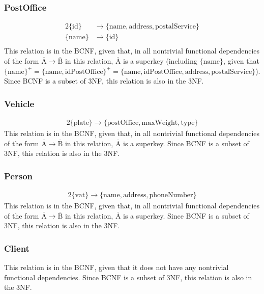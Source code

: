 \documentclass{report}[a4paper]
\theoremstyle{remark}
\begin{document}
\subsubsection{PostOffice}
\begin{alignat*}{2}
\{\text{id}\} &\rightarrow \{\text{name},\text{address},\text{postalService}\} \\
\{\text{name}\} &\rightarrow \{\text{id}\} \\
\end{alignat*}
This relation is in the BCNF, given that, in all nontrivial functional dependencies of the form $\overline{\text{A}} \rightarrow \overline{\text{B}}$ in this relation, $\overline{\text{A}}$ is a superkey (including $\{\text{name}\}$, given that $\{\text{name}\}^+ = \{\text{name}, \text{idPostOffice}\}^+ = \{\text{name}, \text{idPostOffice}, \text{address}, \text{postalService}\}$). Since BCNF is a subset of 3NF, this relation is also in the 3NF.
\subsubsection{Vehicle}
\begin{alignat*}{2}
\{\text{plate}\} \rightarrow \{\text{postOffice},\text{maxWeight},\text{type}\}
\end{alignat*}
This relation is in the BCNF, given that, in all nontrivial functional dependencies of the form $\overline{\text{A}} \rightarrow \overline{\text{B}}$ in this relation, $\overline{\text{A}}$ is a superkey. Since BCNF is a subset of 3NF, this relation is also in the 3NF.
\subsubsection{Person}
\begin{alignat*}{2}
\{\text{vat}\} \rightarrow \{\text{name},\text{address},\text{phoneNumber}\}
\end{alignat*}
This relation is in the BCNF, given that, in all nontrivial functional dependencies of the form $\overline{\text{A}} \rightarrow \overline{\text{B}}$ in this relation, $\overline{\text{A}}$ is a superkey. Since BCNF is a subset of 3NF, this relation is also in the 3NF.
\subsubsection{Client}
This relation is in the BCNF, given that it does not have any nontrivial functional dependencies. Since BCNF is a subset of 3NF, this relation is also in the 3NF.
\end{document}
